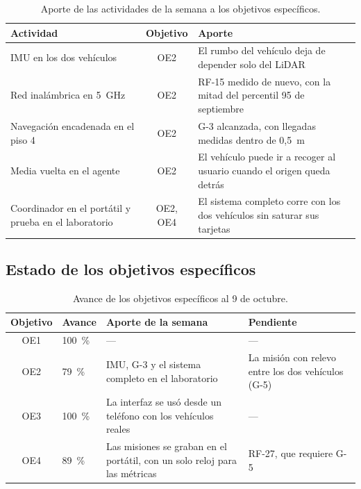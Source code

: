 \documentclass[12pt,letterpaper]{article}
\begin{document}
\begin{table}[H]
    \centering
    \small
    \caption{Aporte de las actividades de la semana a los objetivos específicos.}
    \label{tab:aporte}
    \begin{tabular}{@{}p{4.6cm}cp{7.2cm}@{}}
        \toprule
        \textbf{Actividad} & \textbf{Objetivo} & \textbf{Aporte} \\ \midrule
        IMU en los dos vehículos & OE2 & El rumbo del vehículo deja de depender solo del LiDAR \\ \addlinespace
        Red inalámbrica en 5~GHz & OE2 & RF-15 medido de nuevo, con la mitad del percentil 95 de septiembre \\ \addlinespace
        Navegación encadenada en el piso 4 & OE2 & G-3 alcanzada, con llegadas medidas dentro de 0,5~m \\ \addlinespace
        Media vuelta en el agente & OE2 & El vehículo puede ir a recoger al usuario cuando el origen queda detrás \\ \addlinespace
        Coordinador en el portátil y prueba en el laboratorio & OE2, OE4 & El sistema completo corre con los dos vehículos sin saturar sus tarjetas \\ \bottomrule
    \end{tabular}
\end{table}

\subsection{Estado de los objetivos específicos}

\begin{table}[H]
    \centering
    \small
    \caption{Avance de los objetivos específicos al 9 de octubre.}
    \label{tab:avance}
    \begin{tabular}{@{}cp{1.8cm}p{5.4cm}p{5.0cm}@{}}
        \toprule
        \textbf{Objetivo} & \textbf{Avance} & \textbf{Aporte de la semana} & \textbf{Pendiente} \\ \midrule
        OE1 & 100~\% & --- & --- \\ \addlinespace
        OE2 & 79~\% & IMU, G-3 y el sistema completo en el laboratorio & La misión con relevo entre los dos vehículos (G-5) \\ \addlinespace
        OE3 & 100~\% & La interfaz se usó desde un teléfono con los vehículos reales & --- \\ \addlinespace
        OE4 & 89~\% & Las misiones se graban en el portátil, con un solo reloj para las métricas & RF-27, que requiere G-5 \\ \bottomrule
    \end{tabular}
\end{table}
\end{document}
